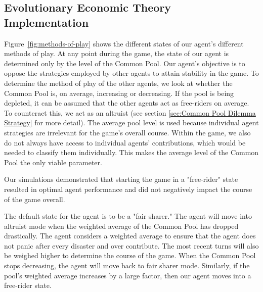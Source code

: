\subsection{Evolutionary Economic Theory Implementation}

Figure~\ref{fig:methods-of-play} shows the different states of our agent's different methods of play. At any point during the game, the state of our agent is determined only by the level of the Common Pool. Our agent's objective is to oppose the strategies employed by other agents to attain stability in the game. To determine the method of play of the other agents, we look at whether the Common Pool is, on average, increasing or decreasing. If the pool is being depleted, it can be assumed that the other agents act as free-riders on average. To counteract this, we act as an altruist (see section \ref{sec:Common Pool Dilemma Strategy} for more detail). The average pool level is used because individual agent strategies are irrelevant for the game's overall course. Within the game, we also do not always have access to individual agents' contributions, which would be needed to classify them individually. This makes the average level of the Common Pool the only viable parameter. 

Our simulations demonstrated that starting the game in a "free-rider" state resulted in optimal agent performance and did not negatively impact the course of the game overall.

The default state for the agent is to be a "fair sharer." The agent will move into altruist mode when the weighted average of the Common Pool has dropped drastically. The agent considers a weighted average to ensure that the agent does not panic after every disaster and over contribute. The most recent turns will also be weighed higher to determine the course of the game. When the Common Pool stops decreasing, the agent will move back to fair sharer mode. Similarly, if the pool's weighted average increases by a large factor, then our agent moves into a free-rider state.

